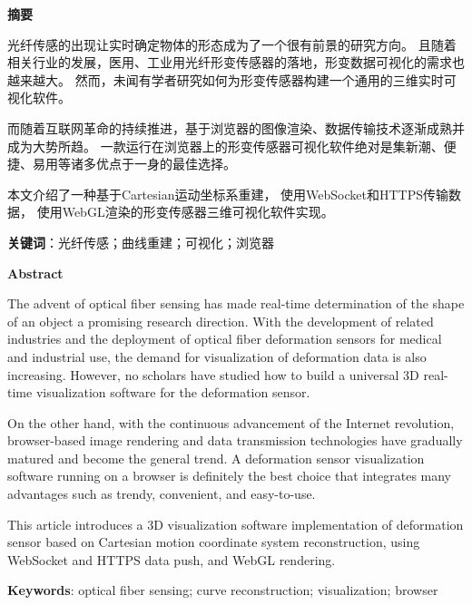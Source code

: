 \cleardoublepage{}
\begin{center}
    \bfseries {} 摘要
\end{center}

光纤传感的出现让实时确定物体的形态成为了一个很有前景的研究方向。
且随着相关行业的发展，医用、工业用光纤形变传感器的落地，形变数据可视化的需求也越来越大。
然而，未闻有学者研究如何为形变传感器构建一个通用的三维实时可视化软件。

而随着互联网革命的持续推进，基于浏览器的图像渲染、数据传输技术逐渐成熟并成为大势所趋。
一款运行在浏览器上的形变传感器可视化软件绝对是集新潮、便捷、易用等诸多优点于一身的最佳选择。

本文介绍了一种基于Cartesian运动坐标系重建，
使用WebSocket和HTTPS传输数据，
使用WebGL渲染的形变传感器三维可视化软件实现。

\textbf{关键词}：光纤传感；曲线重建；可视化；浏览器

\cleardoublepage{}
\begin{center}
    \bfseries {} Abstract
\end{center}

The advent of optical fiber sensing has made real-time determination of the shape of an object a promising research direction. 
With the development of related industries and the deployment of optical fiber deformation sensors for medical and industrial use, 
the demand for visualization of deformation data is also increasing. 
However, no scholars have studied how to build a universal 3D real-time visualization software for the deformation sensor.

On the other hand, with the continuous advancement of the Internet revolution, 
browser-based image rendering and data transmission technologies have gradually matured and become the general trend. 
A deformation sensor visualization software running on a browser is definitely the best choice that integrates many advantages such as trendy, convenient, and easy-to-use.

This article introduces a 3D visualization software implementation of deformation sensor 
based on Cartesian motion coordinate system reconstruction, using WebSocket and HTTPS data push, and WebGL rendering.

\textbf{Keywords}: optical fiber sensing; curve reconstruction; visualization; browser